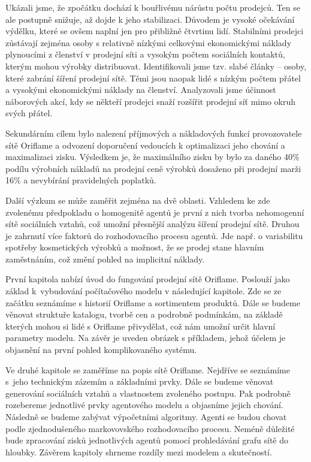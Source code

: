 \documentclass[a4paper,11pt]{report}
\begin{document}
Ukázali jsme, že zpočátku dochází k bouřlivému nárůstu počtu prodejců. Ten se ale postupně snižuje, až dojde k jeho stabilizaci. Důvodem je vysoké očekávání výdělku, které se ovšem naplní jen pro přibližně čtvrtinu lidí. Stabilními prodejci zůstávají zejména osoby s relativně nízkými celkovými ekonomickými náklady plynoucími z členství v prodejní síti a vysokým počtem sociálních kontaktů, kterým mohou výrobky distribuovat. Identifikovali jsme tzv. slabé články -- osoby, které zabrání šíření prodejní sítě. Těmi jsou naopak lidé s nízkým počtem přátel a vysokými ekonomickými náklady na členství. Analyzovali jsme účinnost náborových akcí, kdy se někteří prodejci snaží rozšířit prodejní síť mimo okruh svých přátel.

Sekundárním cílem bylo nalezení příjmových a nákladových funkcí provozovatele sítě Oriflame a odvození doporučení vedoucích k optimalizaci jeho chování a maximalizaci zisku. Výsledkem je, že maximálního zisku by bylo za daného 40\% podílu výrobních nákladů na prodejní ceně výrobků dosaženo při prodejní marži 16\% a nevybírání pravidelných poplatků.

Další výzkum se může zaměřit zejména na dvě oblasti. Vzhledem ke zde zvolenému předpokladu o homogenitě agentů je první z nich tvorba nehomogenní sítě sociálních vztahů, což umožní přesnější analýzu šíření prodejní sítě. Druhou je zahrnutí více faktorů do rozhodovacího procesu agentů. Jde např. o variabilitu spotřeby kosmetických výrobků a možnost, že se prodej stane hlavním zaměstnáním, což změní pohled na implicitní náklady.

První kapitola nabízí úvod do fungování prodejní sítě Oriflame. Poslouží jako základ k~vybudování počítačového modelu v následující kapitole. Zde se ze začátku seznámíme s historií Oriflame a sortimentem produktů. Dále se budeme věnovat struktuře katalogu, tvorbě cen a podrobně podmínkám, na základě kterých mohou si lidé s Oriflame přivydělat, což nám umožní určit hlavní parametry modelu. Na závěr je uveden obrázek s příkladem, jehož účelem je objasnění na první pohled komplikovaného systému.

Ve druhé kapitole se zaměříme na popis sítě Oriflame. Nejdříve se seznámíme s~jeho technickým zázemím a základními prvky. Dále se budeme věnovat generování sociálních vztahů a vlastnostem zvoleného postupu. Pak podrobně rozebereme jednotlivé prvky agentového modelu a objasníme jejich chování. Následně se budeme zabývat výpočetními algoritmy. Agenti se budou chovat podle zjednodušeného markovovského rozhodovacího procesu. Neméně důležité bude zpracování zisků jednotlivých agentů pomocí prohledávání grafu sítě do hloubky. Závěrem kapitoly shrneme rozdíly mezi modelem a skutečností.
\end{document}
